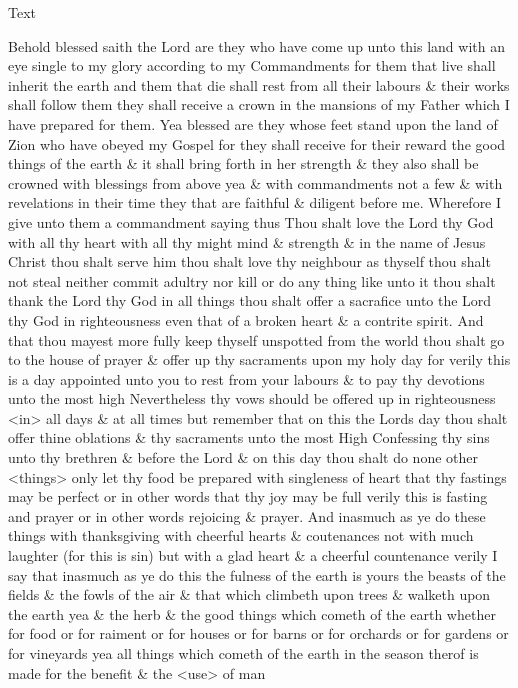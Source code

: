 			
			\begin{description}
				\item[Text]
			\end{description}
			
				Behold blessed saith the Lord are they who have come up unto this land with an eye single to my glory according to my Commandments for them that live shall inherit the earth and them that die shall rest from all their labours \& their works shall follow them they shall receive a crown in the mansions of my Father which I have prepared for them. Yea blessed are they whose feet stand upon the land of Zion who have obeyed my Gospel for they shall receive for their reward the good things of the earth \& it shall bring forth in her strength \& they also shall be crowned with blessings from above yea \& with commandments not a few \& with revelations in their time they that are faithful \& diligent before me. Wherefore I give unto them a commandment saying thus Thou shalt love the Lord thy God with all thy heart with all thy might mind \& strength \& in the name of Jesus Christ thou shalt serve him thou shalt love thy neighbour as thyself thou shalt not steal neither commit adultry nor kill or do any thing like unto it thou shalt thank the Lord thy God in all things thou shalt offer a sacrafice unto the Lord thy God in righteousness even that of a broken heart \& a contrite spirit. And that thou mayest more fully keep thyself unspotted from the world thou shalt go to the house of prayer \& offer up thy sacraments upon my holy day for verily this is a day appointed unto you to rest from your labours \& to pay thy devotions unto the most high Nevertheless thy vows should be offered up in righteousness <in> all days \& at all times but remember that on this the Lords day thou shalt offer thine oblations \& thy sacraments unto the most High Confessing thy sins unto thy brethren \& before the Lord \& on this day thou shalt do none other <things> only let thy food be prepared with singleness of heart that thy fastings may be perfect or in other words that thy joy may be full verily this is fasting and prayer or in other words rejoicing \& prayer. And inasmuch as ye do these things with thanksgiving with cheerful hearts \& coutenances not with much laughter (for this is sin) but with a glad heart \& a cheerful countenance verily I say that inasmuch as ye do this the fulness of the earth is yours the beasts of the fields \& the fowls of the air \& that which climbeth upon trees \& walketh upon the earth yea \& the herb \& the good things which cometh of the earth whether for food or for raiment or for houses or for barns or for orchards or for gardens or for vineyards yea all things which cometh of the earth in the season therof is made for the benefit \& the <use> of man 